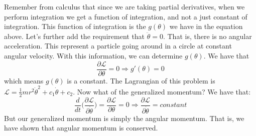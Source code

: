        Remember from calculus that since we are taking partial
        derivatives, when we perform integration we get a function
        of integration, and not a just constant of integration.
        This function of integration is the $g(\theta)$
        we have in the equation above. Let's further add the
        requirement that $\ddot{\theta}=0$. That is,
        there is no angular acceleration.
        This represent a particle going around in a circle at
        constant angular velocity. With this information,
        we can determine $g(\theta)$. We have that
        \begin{equation*}
            \frac{\partial\mathcal{L}}{\partial\theta}
            =0
            \Rightarrow
            g'(\theta)=0
        \end{equation*}
        which means $g(\theta)$ is a constant. The Lagrangian of
        this problem is
        $\mathcal{L}%
         =\frac{1}{2}mr^{2}\dot{\theta}^{2}%
         +c_{1}\dot{\theta}+c_{2}$.
        Now what of the generalized momentum? We have that:
        \begin{equation*}
            \frac{d}{dt}\big(
                \frac{\partial\mathcal{L}}{\partial\dot{\theta}}
             \big)
            =\frac{\partial\mathcal{L}}{\partial\theta}=0
            \Rightarrow
            \frac{\partial\mathcal{L}}{\partial\dot{\theta}}
            =constant
        \end{equation*}
        But our generalized momentum is simply the
        angular momentum. That is, we have shown
        that angular momentum is conserved.